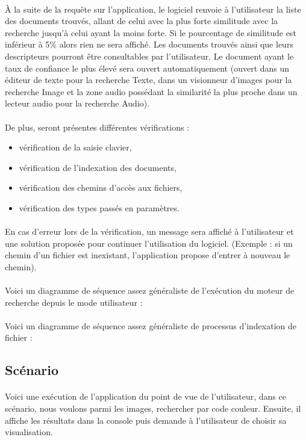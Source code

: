 \paragraph{}
À la suite de la requête sur l’application, le logiciel renvoie à l’utilisateur la liste des documents trouvés, allant de celui avec la plus forte similitude avec la recherche jusqu’à celui ayant la moins forte. Si le pourcentage de similitude est inférieur à 5\% alors rien ne sera affiché. Les documents trouvés ainsi que leurs descripteurs pourront être consultables par l’utilisateur. Le document ayant le taux de confiance le plus élevé sera ouvert automatiquement (ouvert dans un éditeur de texte pour la recherche Texte, dans un visionneur d’images pour la recherche Image et la zone audio possédant la similarité la plus proche dans un lecteur audio pour la recherche Audio).

\paragraph{}
De plus, seront présentes différentes vérifications :
\begin{itemize}
    \item vérification de la saisie clavier,
    \item vérification de l’indexation des documents,
    \item vérification des chemins d’accès aux fichiers,
    \item vérification des types passés en paramètres.
\end{itemize}

\paragraph{}
En cas d’erreur lors de la vérification, un message sera affiché à l’utilisateur et une solution proposée pour continuer l’utilisation du logiciel. (Exemple : si un chemin d’un fichier est inexistant, l’application propose d’entrer à nouveau le chemin).

\paragraph{}
Voici un diagramme de séquence assez généraliste de l’exécution du moteur de recherche depuis le mode utilisateur : 

\paragraph{}
Voici un diagramme de séquence assez généraliste de processus d’indexation de fichier : 

\subsection{Scénario}
\paragraph{}
Voici une exécution de l’application du point de vue de l’utilisateur, dans ce scénario, nous voulons parmi les images, rechercher par code couleur. Ensuite, il affiche les résultats dans la console puis demande à l'utilisateur de choisir sa visualisation.